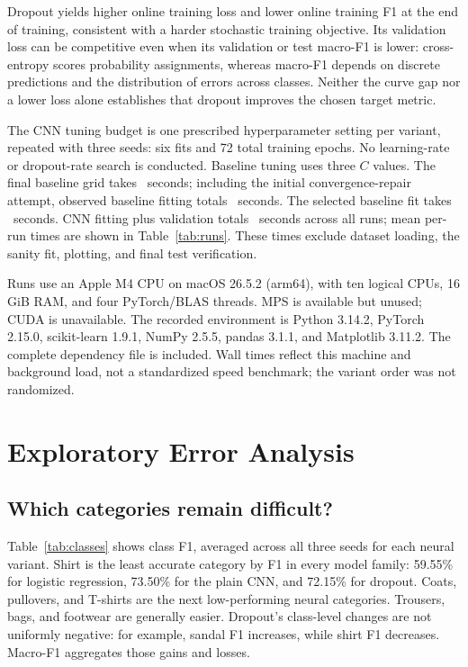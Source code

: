 \documentclass[conference]{IEEEtran}
\begin{document}
Dropout yields higher online training loss and lower online training F1 at the end of training, consistent with a harder stochastic training objective. Its validation loss can be competitive even when its validation or test macro-F1 is lower: cross-entropy scores probability assignments, whereas macro-F1 depends on discrete predictions and the distribution of errors across classes. Neither the curve gap nor a lower loss alone establishes that dropout improves the chosen target metric.

The CNN tuning budget is one prescribed hyperparameter setting per variant, repeated with three seeds: six fits and 72 total training epochs. No learning-rate or dropout-rate search is conducted. Baseline tuning uses three $C$ values. The final baseline grid takes \BaselineBudget\ seconds; including the initial convergence-repair attempt, observed baseline fitting totals \BaselineAllBudget\ seconds. The selected baseline fit takes \LogTime\ seconds. CNN fitting plus validation totals \TotalCNNTime\ seconds across all runs; mean per-run times are shown in Table~\ref{tab:runs}. These times exclude dataset loading, the sanity fit, plotting, and final test verification.

Runs use an Apple M4 CPU on macOS 26.5.2 (arm64), with ten logical CPUs, 16 GiB RAM, and four PyTorch/BLAS threads. MPS is available but unused; CUDA is unavailable. The recorded environment is Python 3.14.2, PyTorch 2.15.0, scikit-learn 1.9.1, NumPy 2.5.5, pandas 3.1.1, and Matplotlib 3.11.2. The complete dependency file is included. Wall times reflect this machine and background load, not a standardized speed benchmark; the variant order was not randomized.

\section{Exploratory Error Analysis}
\subsection{Which categories remain difficult?}
Table~\ref{tab:classes} shows class F1, averaged across all three seeds for each neural variant. Shirt is the least accurate category by F1 in every model family: 59.55\% for logistic regression, 73.50\% for the plain CNN, and 72.15\% for dropout. Coats, pullovers, and T-shirts are the next low-performing neural categories. Trousers, bags, and footwear are generally easier. Dropout's class-level changes are not uniformly negative: for example, sandal F1 increases, while shirt F1 decreases. Macro-F1 aggregates those gains and losses.
\end{document}
